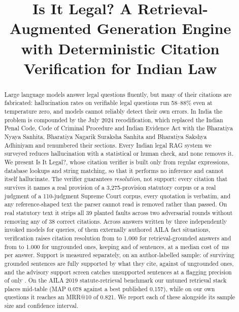 \documentclass[conference]{IEEEtran}
\begin{document}
\title{Is It Legal? A Retrieval-Augmented Generation Engine with Deterministic Citation Verification for Indian Law}

\author{
\and
{}
}

\maketitle

\begin{abstract}
Large language models answer legal questions fluently, but many of their citations are fabricated: hallucination rates on verifiable legal questions run 58--88\% even at temperature zero, and models cannot reliably detect their own errors. In India the problem is compounded by the July 2024 recodification, which replaced the Indian Penal Code, Code of Criminal Procedure and Indian Evidence Act with the Bharatiya Nyaya Sanhita, Bharatiya Nagarik Suraksha Sanhita and Bharatiya Sakshya Adhiniyam and renumbered their sections. Every Indian legal RAG system we surveyed reduces hallucination with a statistical or human check, and none removes it. We present Is It Legal?, whose citation verifier is built only from regular expressions, database lookups and string matching, so that it performs no inference and cannot itself hallucinate. The verifier guarantees \emph{resolution}, not support: every citation that survives it names a real provision of a 3,275-provision statutory corpus or a real judgment of a 110-judgment Supreme Court corpus, every quotation is verbatim, and any reference-shaped text the parser cannot read is removed rather than passed. On real statutory text it strips all 39 planted faults across two adversarial rounds without removing any of 38 correct citations. Across \RtwoAnswers{} answers written by three independently invoked models for \RtwoQueries{} queries, \RtwoQueriesAila{} of them externally authored AILA fact situations, verification raises citation resolution from \RtwoGroundedPre{} to 1.000 for retrieval-grounded answers and from \RtwoUngroundedPre{} to 1.000 for ungrounded ones, keeping \RtwoGroundedCov{} and \RtwoUngroundedCov{} of sentences, at a median cost of \LatencyMedian\,ms per answer. Support is measured separately, on an author-labelled sample: \SupGroundedPrec{} of surviving grounded sentences are fully supported by what they cite, against \SupUngroundedPrec{} of ungrounded ones, and the advisory support screen catches \SupVfiveCaught{} unsupported sentences at a flagging precision of only \SupVfiveFlagPrec{}. On the AILA 2019 statute-retrieval benchmark our untuned retrieval stack places mid-table (MAP 0.078 against a best published 0.157), while on our own questions it reaches an MRR@10 of 0.821. We report each of these alongside its sample size and confidence interval.
\end{abstract}
\end{document}
